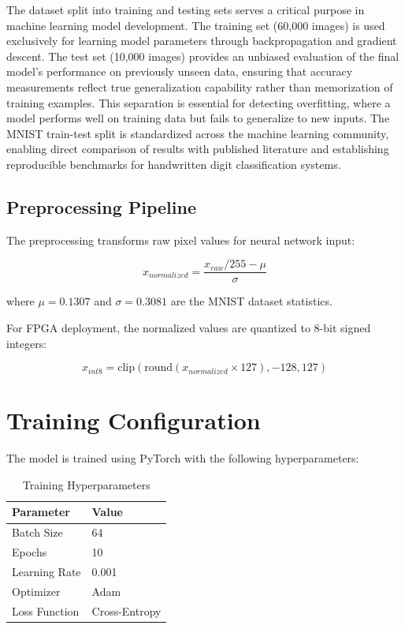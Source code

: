 \documentclass[12pt,a4paper]{report}
\begin{document}
The dataset split into training and testing sets serves a critical purpose in machine learning model development. The training set (60,000 images) is used exclusively for learning model parameters through backpropagation and gradient descent. The test set (10,000 images) provides an unbiased evaluation of the final model's performance on previously unseen data, ensuring that accuracy measurements reflect true generalization capability rather than memorization of training examples. This separation is essential for detecting overfitting, where a model performs well on training data but fails to generalize to new inputs. The MNIST train-test split is standardized across the machine learning community, enabling direct comparison of results with published literature and establishing reproducible benchmarks for handwritten digit classification systems.

\subsection{Preprocessing Pipeline}

The preprocessing transforms raw pixel values for neural network input:

\begin{equation}
x_{normalized} = \frac{x_{raw}/255 - \mu}{\sigma}
\end{equation}

where $\mu = 0.1307$ and $\sigma = 0.3081$ are the MNIST dataset statistics.

For FPGA deployment, the normalized values are quantized to 8-bit signed integers:

\begin{equation}
x_{int8} = \text{clip}\left(\text{round}(x_{normalized} \times 127), -128, 127\right)
\end{equation}

\section{Training Configuration}

The model is trained using PyTorch \parencite{pytorch} with the following hyperparameters:

\begin{table}[H]
\centering
\caption{Training Hyperparameters}
\begin{tabular}{ll}
\toprule
\textbf{Parameter} & \textbf{Value} \\
\midrule
Batch Size & 64 \\
Epochs & 10 \\
Learning Rate & 0.001 \\
Optimizer & Adam \\
Loss Function & Cross-Entropy \\
\bottomrule
\end{tabular}
\end{table}
\end{document}
